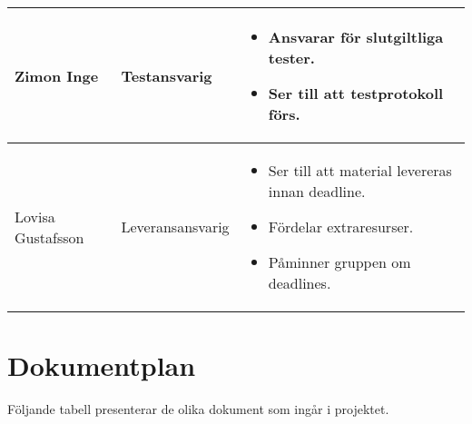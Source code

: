 \documentclass[11pt]{article}
\begin{document}
\begin{flushleft}
\begin{longtable}{| p{.2\linewidth} | p{.2\linewidth} | p{.5\linewidth} |}
Zimon Inge & Testansvarig & \vspace{-\baselineskip}
\begin{itemize}[label={--},leftmargin=*,nosep]
\item Ansvarar för slutgiltliga tester.
\item Ser till att testprotokoll förs.
\vspace{-\baselineskip}
\end{itemize}
\\ \hline

Lovisa Gustafsson & Leveransansvarig & \vspace{-\baselineskip}
\begin{itemize}[label={--},leftmargin=*,nosep]
\item Ser till att material levereras innan deadline.
\item Fördelar extraresurser.
\item Påminner gruppen om deadlines.
\vspace{-\baselineskip}
\end{itemize}
\\ \hline

\end{longtable}

\pagebreak
\section{Dokumentplan}
Följande tabell presenterar de olika dokument som ingår i projektet. 


\end{flushleft}
\end{document}
